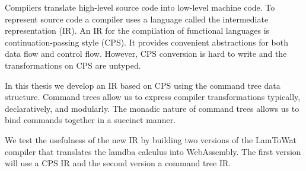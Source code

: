 
Compilers translate high-level source code into low-level machine code. To represent source code a compiler uses a language called the intermediate representation (IR). An IR for the compilation of functional languages is continuation-passing style (CPS). It provides convenient abstractions for both data flow and control flow. However, CPS conversion is hard to write and the transformations on CPS are untyped.

In this thesis we develop an IR based on CPS using the command tree data structure. Command trees allow us to express compiler transformations typically, declaratively, and modularly. The monadic nature of command trees allows us to bind commands together in a succinct manner.

We test the usefulness of the new IR by building two versions of the LamToWat compiler that translates the lamdba calculus into WebAssembly. The first version will use a CPS IR and the second version a command tree IR.